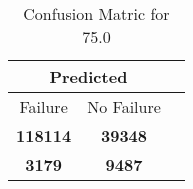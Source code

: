 \begin{table}[] 
\caption{Confusion Matric for 75.0} 
\label{Table: Prediction Accuracy-None75.0RandomForest100EKF-ignoreReflection-Reflection} 
\centering 
\begin{tabular} 
 {@{}ccc@{}} 
\toprule 
\multicolumn{2}{c}{\textbf{Predicted}}
 \\ \midrule 
\multicolumn{1}{|c|}{Failure} & 
\multicolumn{1}{c|}{No Failure}
 \\ \midrule 
\multicolumn{1}{|c|}{\color{green}\textbf{118114}} & 
\multicolumn{1}{c|}{\color{green}\textbf{39348}}
 \\ \midrule 
\multicolumn{1}{|c|}{\color{red}\textbf{3179}} & 
\multicolumn{1}{c|}{\color{red}\textbf{9487}}
 \\ \bottomrule 
\end{tabular} 
\end{table} 
